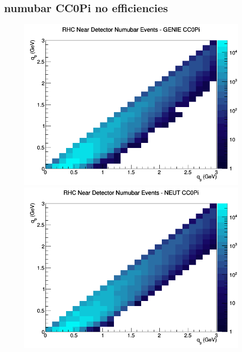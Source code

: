 \documentclass[12pt]{article}
\begin{document}
\subsection{numubar CC0Pi no efficiencies}
\begin{figure}[h]
\includegraphics[width=\linewidth]{q0_q3/nominal/CC0Pi_RHC_ND_numubar_q3_q0_GENIE.png}
\endminipage
{}
\includegraphics[width=\linewidth]{q0_q3/nominal/CC0Pi_RHC_ND_numubar_q3_q0_NEUT.png}
\endminipage
{}

\end{figure}
\end{document}
